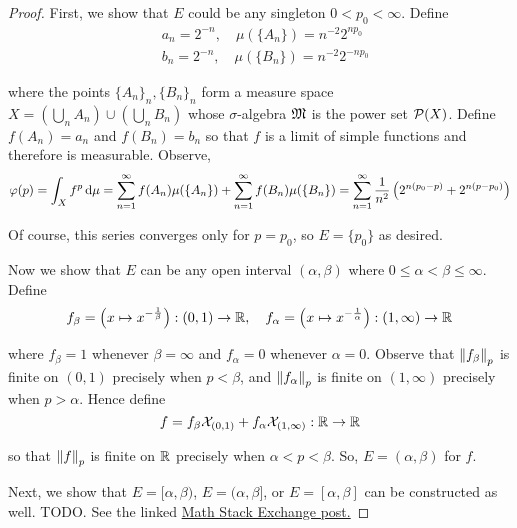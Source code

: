 \begin{proof}
     First, we show that \(E\) could be any singleton \(0 < p_0 < \infty\). Define 
    \begin{align*}
        & a_n = 2^{-n}, \quad \mu(\{A_n\}) = n^{-2} 2^{np_0}  \\
        & b_n = 2^{-n}, \quad \mu(\{B_n\}) = n^{-2} 2^{-np_0}
    \end{align*}

    where the points \(\{A_n\}_n, \{B_n\}_n\) form a measure space \(X = \left(\bigcup_n A_n\right) \cup \left(\bigcup_n B_n\right)\) whose \(\sigma\)-algebra \(\mathfrak{M}\) is the power set \(\mathcal{P}(X)\). Define \(f(A_n) = a_n\) and \(f(B_n) = b_n\) so that \(f\) is a limit of simple functions and therefore is measurable. Observe, 
    \[
        \varphi(p) = \int_X f^p \, \mathrm{d}\mu = \sum_{n=1}^\infty f(A_n) \mu(\{A_n\}) + \sum_{n=1}^\infty f(B_n) \mu(\{B_n\})
        = \sum_{n=1}^\infty \frac{1}{n^2} \left( 2^{n(p_0 - p)} + 2^{n(p - p_0)} \right)
    \]

    Of course, this series converges only for \(p = p_0\), so \(E = \{p_0\}\) as desired. 
    \stdvspace

    Now we show that \(E\) can be any open interval \((\alpha, \beta)\) where \(0 \leq \alpha < \beta \leq \infty\). Define
    \[
        f_\beta = \left(x \mapsto x^{-\frac{1}{\beta}}\right) : (0,1) \to \mathbb{R}, 
        \quad 
        f_\alpha = \left(x \mapsto x^{-\frac{1}{\alpha}}\right) : (1,\infty) \to \mathbb{R}
    \]
    
    where \(f_\beta = 1\) whenever \(\beta = \infty\) and \(f_\alpha = 0\) whenever \(\alpha = 0\). Observe that \(\norm{f_\beta}_p\) is finite on \((0,1)\) precisely when \(p < \beta\), and \(\norm{f_\alpha}_p\) is finite on \((1, \infty)\) precisely when \(p > \alpha\). Hence define 
    \[
        f = f_\beta \mathcal{X}_{(0,1)} + f_\alpha \mathcal{X}_{(1, \infty)} : \mathbb{R} \to \mathbb{R}
    \]

    so that \(\norm{f}_p\) is finite on \(\mathbb{R}\) precisely when \(\alpha < p < \beta\). So, \(E = (\alpha, \beta)\) for \(f\). 
    \stdvspace

    Next, we show that \(E = [\alpha, \beta)\), \(E = (\alpha, \beta]\), or \(E = [\alpha, \beta]\) can be constructed as well. TODO. See the linked \href{https://math.stackexchange.com/questions/3186292/rudins-real-and-complex-analysis-exercise-3-4-c}{Math Stack Exchange post.} 
\end{proof}

